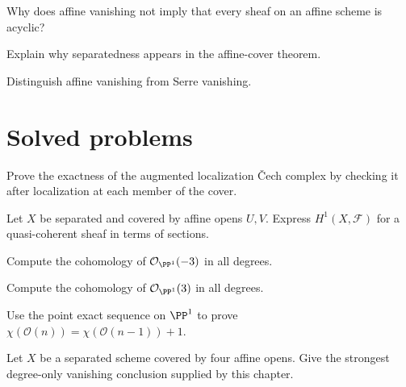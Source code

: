 \begin{exercise}\label{exr:vi49-22}
Why does affine vanishing not imply that every sheaf on an affine scheme is acyclic?
\end{exercise}

\begin{exercise}\label{exr:vi49-23}
Explain why separatedness appears in the affine-cover theorem.
\end{exercise}

\begin{exercise}\label{exr:vi49-24}
Distinguish affine vanishing from Serre vanishing.
\end{exercise}

\ifdefined\IncludeExerciseHints

\fi
\ifdefined\IncludeExerciseSolutions

\fi

\section{Solved problems}
\begin{problem}\label{prob:vi49-01}
Prove the exactness of the augmented localization Čech complex by checking it after localization at each member of the cover.
\end{problem}

\begin{problem}\label{prob:vi49-02}
Let $X$ be separated and covered by affine opens $U,V$. Express $H^1(X,\mathcal F)$ for a quasi-coherent sheaf in terms of sections.
\end{problem}

\begin{problem}\label{prob:vi49-03}
Compute the cohomology of $\mathcal O_{\PP^1}(-3)$ in all degrees.
\end{problem}

\begin{problem}\label{prob:vi49-04}
Compute the cohomology of $\mathcal O_{\PP^1}(3)$ in all degrees.
\end{problem}

\begin{problem}\label{prob:vi49-05}
Use the point exact sequence on $\PP^1$ to prove $\chi(\mathcal O(n))=\chi(\mathcal O(n-1))+1$.
\end{problem}

\begin{problem}\label{prob:vi49-06}
Let $X$ be a separated scheme covered by four affine opens. Give the strongest degree-only vanishing conclusion supplied by this chapter.
\end{problem}

